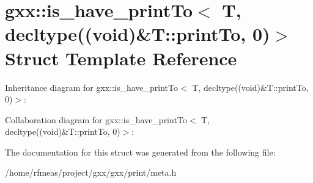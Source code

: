 \hypertarget{structgxx_1_1is__have__printTo_3_01T_00_01decltype_07_07void_08_6T_1_1printTo_00_010_08_4}{}\section{gxx\+:\+:is\+\_\+have\+\_\+print\+To$<$ T, decltype((void)\&T\+:\+:print\+To, 0)$>$ Struct Template Reference}
\label{structgxx_1_1is__have__printTo_3_01T_00_01decltype_07_07void_08_6T_1_1printTo_00_010_08_4}


Inheritance diagram for gxx\+:\+:is\+\_\+have\+\_\+print\+To$<$ T, decltype((void)\&T\+:\+:print\+To, 0)$>$\+:


Collaboration diagram for gxx\+:\+:is\+\_\+have\+\_\+print\+To$<$ T, decltype((void)\&T\+:\+:print\+To, 0)$>$\+:


The documentation for this struct was generated from the following file\+:\begin{DoxyCompactItemize}
\item 
/home/rfmeas/project/gxx/gxx/print/meta.\+h\end{DoxyCompactItemize}
